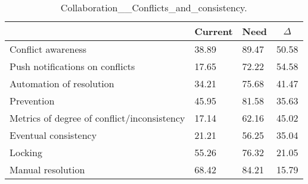 
  \begin{table*}[]
  \centering
  \notsotiny
  \caption{ Collaboration__Conflicts_and_consistency.}
\label{tab:collaboration__conflicts_and_consistency}
\begin{tabular}{|l|l|l|l|}
  \hline
  \rowcolor[HTML]{C0C0C0}
    \multicolumn{1}{|c|}{Feature} & \multicolumn{1}{c|}{Current} & \multicolumn{1}{c|}{Need} & \multicolumn{1}{c|}{$\Delta$} \\ \hline
  Conflict awareness & 38.89 & 89.47 & 50.58 \\ \hline 
Push notifications on conflicts & 17.65 & 72.22 & 54.58 \\ \hline 
Automation of resolution & 34.21 & 75.68 & 41.47 \\ \hline 
Prevention & 45.95 & 81.58 & 35.63 \\ \hline 
Metrics of degree of conflict/inconsistency & 17.14 & 62.16 & 45.02 \\ \hline 
Eventual consistency & 21.21 & 56.25 & 35.04 \\ \hline 
Locking & 55.26 & 76.32 & 21.05 \\ \hline 
Manual resolution & 68.42 & 84.21 & 15.79 \\ \hline 
\end{tabular}%
  \end{table*}